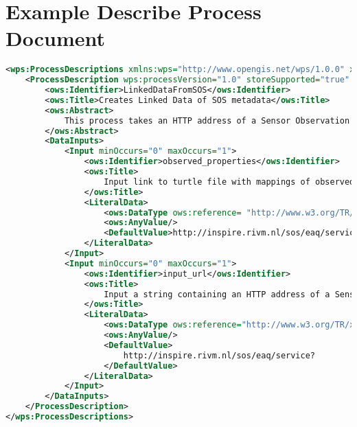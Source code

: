 \section{Example Describe Process Document}
\label{app:wpsDescribe}
\begin{lstlisting}[language=xml]
	<wps:ProcessDescriptions xmlns:wps="http://www.opengis.net/wps/1.0.0" xmlns:ows="http://www.opengis.net/ows/1.1" xmlns:xlink="http://www.w3.org/1999/xlink" xmlns:xsi="http://www.w3.org/2001/XMLSchema-instance" xsi:schemaLocation="http://www.opengis.net/wps/1.0.0 http://schemas.opengis.net/wps/1.0.0/wpsDescribeProcess_response.xsd" service="WPS" version="1.0.0" xml:lang="en-CA">
	<ProcessDescription wps:processVersion="1.0" storeSupported="true" statusSupported="false">
		<ows:Identifier>LinkedDataFromSOS</ows:Identifier>
		<ows:Title>Creates Linked Data of SOS metadata</ows:Title>
		<ows:Abstract>
			This process takes an HTTP address of a Sensor Observation Service (SOS) as input and converts the metadata to linked data.
		</ows:Abstract>
		<DataInputs>
			<Input minOccurs="0" maxOccurs="1">
				<ows:Identifier>observed_properties</ows:Identifier>
				<ows:Title>
					Input link to turtle file with mappings of observed property identifiers to DBPedia URIs
				</ows:Title>
				<LiteralData>
					<ows:DataType ows:reference= "http://www.w3.org/TR/xmlschema-2/#string"> string</ows:DataType>
					<ows:AnyValue/>
					<DefaultValue>http://inspire.rivm.nl/sos/eaq/service?</DefaultValue>
				</LiteralData>
			</Input>
			<Input minOccurs="0" maxOccurs="1">
				<ows:Identifier>input_url</ows:Identifier>
				<ows:Title>
					Input a string containing an HTTP address of a Sensor Observation Service (SOS). For example: 'http://someaddress.com/sos?'
				</ows:Title>
				<LiteralData>
					<ows:DataType ows:reference="http://www.w3.org/TR/xmlschema-2/#string"> string</ows:DataType>
					<ows:AnyValue/>
					<DefaultValue>
						http://inspire.rivm.nl/sos/eaq/service? 
					</DefaultValue>
				</LiteralData>
			</Input>
		</DataInputs>
	</ProcessDescription>
</wps:ProcessDescriptions>
\end{lstlisting}

\clearpage

